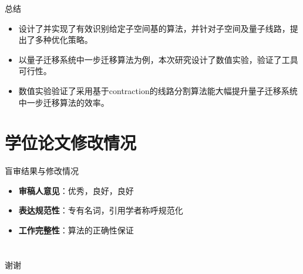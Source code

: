 \documentclass[aspectratio=1610]{ctexbeamer}
\begin{document}

\begin{frame}{总结}
    \begin{itemize}
        \item 设计了并实现了有效识别给定子空间基的算法，并针对子空间及量子线路，提出了多种优化策略。
        \item 以量子迁移系统中一步迁移算法为例，本次研究设计了数值实验，验证了工具可行性。
        \item 数值实验验证了采用基于contraction的线路分割算法能大幅提升量子迁移系统中一步迁移算法的效率。
    \end{itemize}
\end{frame}
\section{学位论文修改情况}
\begin{frame}{盲审结果与修改情况}
    \begin{itemize}
        \item \textbf{审稿人意见}：优秀，良好，良好
        \item \textbf{表达规范性}：专有名词，引用学者称呼规范化
        \item \textbf{工作完整性}：算法的正确性保证
    \end{itemize}
\end{frame}
\section*{}
\begin{frame}
    \centering
    \Huge 谢谢
\end{frame}
\end{document}
